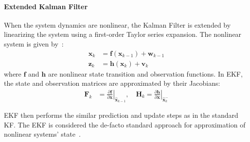 \paragraph{Extended Kalman Filter}
When the system dynamics are nonlinear, the Kalman Filter is extended by linearizing the system using a first-order Taylor series expansion. The nonlinear system is given by~\cite{wiley_kalman}:
\begin{align}
    \mathbf{x}_k &= \bm{f}(\mathbf{x}_{k-1}) + \mathbf{w}_{k-1} \\
    \mathbf{z}_k &= \bm{h}(\mathbf{x}_k) + \mathbf{v}_k
\end{align}
where $\bm{f}$ and $\bm{h}$ are nonlinear state transition and observation functions. In EKF, the state and observation matrices are approximated by their Jacobians:
\begin{align}
    \mathbf{F}_{k} &= \left.\frac{\partial \bm{f}}{\partial \mathbf{x}}\right|_{\hat{\mathbf{x}}_{k-1}} , \quad
    \mathbf{H}_k = \left.\frac{\partial \bm{h}}{\partial \mathbf{x}}\right|_{\hat{\mathbf{x}}_k^-}
\end{align}

EKF then performs the similar prediction and update steps as in the standard KF. The EKF is considered the de-facto standard approach for approximation of nonlinear systems' state~\cite{julier2004unscented}.



